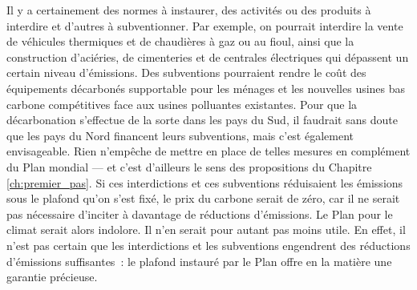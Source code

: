\documentclass[a5paper,french,openany]{memoir}
\begin{document}
Il y a certainement des normes à instaurer, des activités ou des produits à interdire et d'autres à subventionner. Par exemple, on pourrait interdire la vente de véhicules thermiques et de chaudières à gaz ou au fioul, ainsi que la construction d'aciéries, de cimenteries et de centrales électriques qui dépassent un certain niveau d'émissions. Des subventions pourraient rendre le coût des équipements décarbonés supportable pour les ménages et les nouvelles usines bas carbone compétitives face aux usines polluantes existantes. Pour que la décarbonation s'effectue de la sorte dans les pays du Sud, il faudrait sans doute que les pays du Nord financent leurs subventions, mais c'est également envisageable. Rien n'empêche de mettre en place de telles mesures en complément du Plan mondial --- et c'est d'ailleurs le sens des propositions du Chapitre \ref{ch:premier_pas}. Si ces interdictions et ces subventions réduisaient les émissions sous le plafond qu'on s'est fixé, le prix du carbone serait de zéro, car il ne serait pas nécessaire d'inciter à davantage de réductions d'émissions. Le Plan pour le climat serait alors indolore. Il n'en serait pour autant pas moins utile. En effet, il n'est pas certain que les interdictions et les subventions engendrent des réductions d'émissions suffisantes~: le plafond instauré par le Plan offre en la matière une garantie précieuse.
\end{document}
